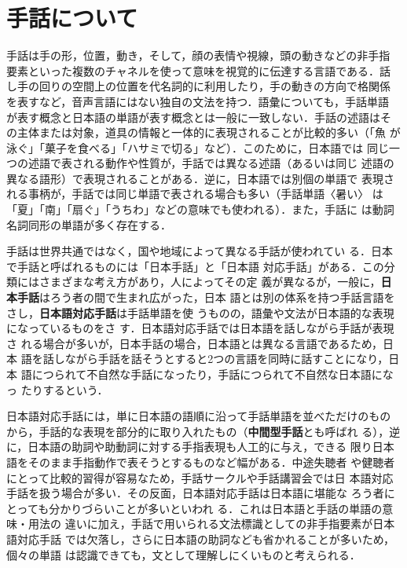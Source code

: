 \section{手話について}

手話は手の形，位置，動き，そして，顔の表情や視線，頭の動きなどの非手指
要素といった複数のチャネルを使って意味を視覚的に伝達する言語である．話
し手の回りの空間上の位置を代名詞的に利用したり，手の動きの方向で格関係
を表すなど，音声言語にはない独自の文法を持つ．語彙についても，手話単語
が表す概念と日本語の単語が表す概念とは一般に一致しない．手話の述語はそ
の主体または対象，道具の情報と一体的に表現されることが比較的多い（「魚
が泳ぐ」「菓子を食べる」「ハサミで切る」など）．このために，日本語では
同じ一つの述語で表される動作や性質が，手話では異なる述語（あるいは同じ
述語の異なる語形）で表現されることがある．逆に，日本語では別個の単語で
表現される事柄が，手話では同じ単語で表される場合も多い（手話単語〈暑い〉
は「夏」「南」「扇ぐ」「うちわ」などの意味でも使われる）．また，手話に
は動詞名詞同形の単語が多く存在する．

手話は世界共通ではなく，国や地域によって異なる手話が使われてい
る\cite{Gordon2005}．日本で手話と呼ばれるものには「日本手話」と「日本語
対応手話」がある．この分類にはさまざまな考え方があり，人によってその定
義が異なるが，一般に，{\bf 日本手話}はろう者の間で生まれ広がった，日本
語とは別の体系を持つ手話言語をさし，{\bf 日本語対応手話}は手話単語を使
うものの，語彙や文法が日本語的な表現になっているものをさ
す\cite{Yonekawa2004}．日本語対応手話では日本語を話しながら手話が表現さ
れる場合が多いが，日本手話の場合，日本語とは異なる言語であるため，日本
語を話しながら手話を話そうとすると2つの言語を同時に話すことになり，日本
語につられて不自然な手話になったり，手話につられて不自然な日本語になっ
たりするという\cite{Yonekawa2004}．

日本語対応手話には，単に日本語の語順に沿って手話単語を並べただけのもの
から，手話的な表現を部分的に取り入れたもの（{\bf 中間型手話}とも呼ばれ
る），逆に，日本語の助詞や助動詞に対する手指表現も人工的に与え，できる
限り日本語をそのまま手指動作で表そうとするものなど幅がある．中途失聴者
や健聴者にとって比較的習得が容易なため，手話サークルや手話講習会では日
本語対応手話を扱う場合が多い．その反面，日本語対応手話は日本語に堪能な
ろう者にとっても分かりづらいことが多いといわれ
る\cite{Akiyama2004,Ichida2005}．これは日本語と手話の単語の意味・用法の
違いに加え，手話で用いられる文法標識としての非手指要素が日本語対応手話
では欠落し，さらに日本語の助詞なども省かれることが多いため，個々の単語
は認識できても，文として理解しにくいものと考えられる．

